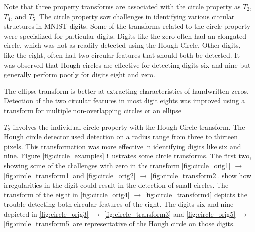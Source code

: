 Note that three property transforms are associated with the circle property as
$T_2$, $T_4$, and $T_5$. The circle property saw challenges in identifying
various circular structures in MNIST digits. Some of the transforms related to
the circle property were specialized for particular digits. Digits like the zero
often had an elongated circle, which was not as readily detected using the Hough
Circle. Other digits, like the eight, often had two circular features that
should both be detected. It was observed that Hough circles are effective for
detecting digits six and nine but generally perform poorly for digits eight and
zero.

The ellipse transform is better at extracting characteristics of handwritten
zeros. Detection of the two circular features in most digit eights was improved
using a transform for multiple non-overlapping circles or an ellipse.

$T_2$ involves the individual circle property with the Hough Circle transform.
The Hough circle detector used detection on a radius range from three to
thirteen pixels. This transformation was more effective in identifying digits
like six and nine. Figure \ref{fig:circle_examples} illustrates some circle
transforms. The first two, showing some of the challenges with zero in the
transform \ref{fig:circle_orig1} $\rightarrow$ \ref{fig:circle_transform1} and
\ref{fig:circle_orig2} $\rightarrow$ \ref{fig:circle_transform2}, show how
irregularities in the digit could result in the detection of small circles. The
transform of the eight in \ref{fig:circle_orig4} $\rightarrow$
\ref{fig:circle_transform4} depicts the trouble detecting both circular features
of the eight. The digits six and nine depicted in \ref{fig:circle_orig3} $\rightarrow$
\ref{fig:circle_transform3} and \ref{fig:circle_orig5} $\rightarrow$
\ref{fig:circle_transform5} are representative of the Hough circle on those
digits.


